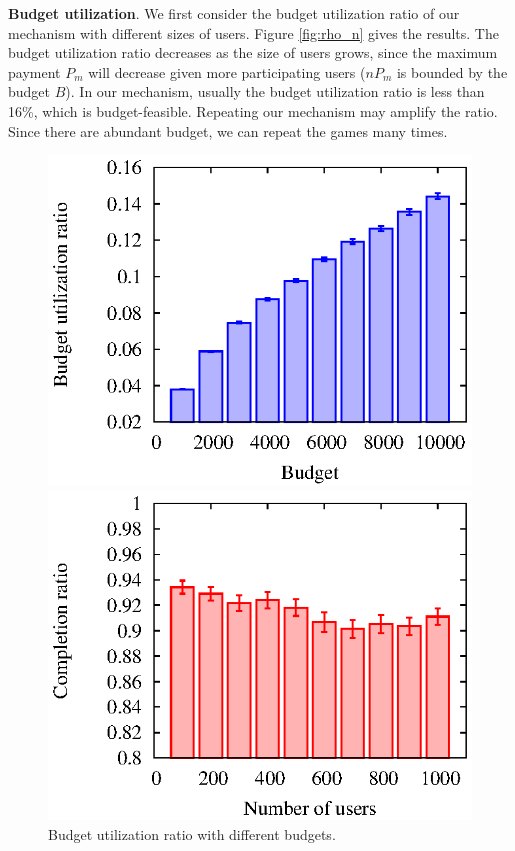 \documentclass[conference]{IEEEtran}
\theoremstyle{definition}
\begin{document}
{{\bf Budget utilization}. We first consider the budget utilization ratio of our mechanism with different sizes of users. Figure \ref{fig:rho_n} gives the results. The budget utilization ratio decreases as the size of users grows, since the maximum payment $P_m$ will decrease given more participating users ($nP_m$ is bounded by the budget $B$). In our mechanism, usually the budget utilization ratio is less than 16\%, which is budget-feasible. Repeating our mechanism may amplify the ratio. Since there are abundant budget, we can repeat the games many times.

\begin{figure}[!t]
\centering
\begin{minipage}{0.31\textwidth}
\includegraphics[width=\textwidth]{collusion_resist_codes/images/img_rho_R.eps}
\caption{Budget utilization ratio with different budgets.}
\label{fig:rho_R}
\end{minipage}
\hspace{0.01cm}
\begin{minipage}{0.31\textwidth}
\includegraphics[width=\textwidth]{collusion_resist_codes/images/img_rtask_n.eps}

\end{minipage}
\end{figure}}
\end{document}
